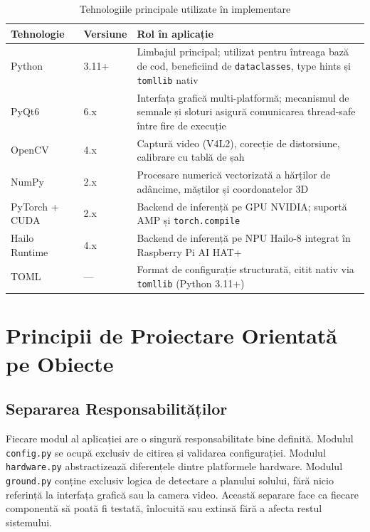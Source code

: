 \begin{table}[htbp]
\centering
\renewcommand{\arraystretch}{1.35}
\begin{tabular}{|l|l|p{7cm}|}
\hline
\textbf{Tehnologie} & \textbf{Versiune} & \textbf{Rol în aplicație} \\
\hline
Python & 3.11+ & Limbajul principal; utilizat pentru întreaga bază de cod, beneficiind de \texttt{dataclasses}, type hints și \texttt{tomllib} nativ \\
\hline
PyQt6 & 6.x & Interfața grafică multi-platformă; mecanismul de semnale și sloturi asigură comunicarea thread-safe între fire de execuție \\
\hline
OpenCV & 4.x & Captură video (V4L2), corecție de distorsiune, calibrare cu tablă de șah \\
\hline
NumPy & 2.x & Procesare numerică vectorizată a hărților de adâncime, măștilor și coordonatelor 3D \\
\hline
PyTorch + CUDA & 2.x & Backend de inferență pe GPU NVIDIA; suportă AMP și \texttt{torch.compile} \\
\hline
Hailo Runtime & 4.x & Backend de inferență pe NPU Hailo-8 integrat în Raspberry Pi AI HAT+ \\
\hline
TOML & — & Format de configurație structurată, citit nativ via \texttt{tomllib} (Python 3.11+) \\
\hline
\end{tabular}
\caption{Tehnologiile principale utilizate în implementare}
\label{tab:tech}
\end{table}

\section{Principii de Proiectare Orientată pe Obiecte}

\subsection{Separarea Responsabilităților}

Fiecare modul al aplicației are o singură responsabilitate bine definită. Modulul \texttt{config.py} se ocupă exclusiv de citirea și validarea configurației. Modulul \texttt{hardware.py} abstractizează diferențele dintre platformele hardware. Modulul \texttt{ground.py} conține exclusiv logica de detectare a planului solului, fără nicio referință la interfața grafică sau la camera video. Această separare face ca fiecare componentă să poată fi testată, înlocuită sau extinsă fără a afecta restul sistemului.

